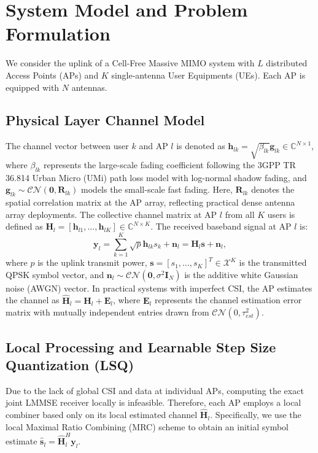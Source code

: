 \section{System Model and Problem Formulation}

We consider the uplink of a Cell-Free Massive MIMO system with $L$ distributed Access Points (APs) and $K$ single-antenna User Equipments (UEs). Each AP is equipped with $N$ antennas. 

\subsection{Physical Layer Channel Model}
The channel vector between user $k$ and AP $l$ is denoted as $\mathbf{h}_{lk} = \sqrt{\beta_{lk}} \mathbf{g}_{lk} \in \mathbb{C}^{N \times 1}$, where $\beta_{lk}$ represents the large-scale fading coefficient following the 3GPP TR 36.814 Urban Micro (UMi) path loss model with log-normal shadow fading, and $\mathbf{g}_{lk} \sim \mathcal{CN}(\mathbf{0}, \mathbf{R}_{lk})$ models the small-scale fast fading. Here, $\mathbf{R}_{lk}$ denotes the spatial correlation matrix at the AP array, reflecting practical dense antenna array deployments. 
The collective channel matrix at AP $l$ from all $K$ users is defined as $\mathbf{H}_l = [\mathbf{h}_{l1}, \dots, \mathbf{h}_{lK}] \in \mathbb{C}^{N \times K}$. The received baseband signal at AP $l$ is:
\begin{equation}
    \mathbf{y}_l = \sum_{k=1}^K \sqrt{p} \mathbf{h}_{lk} s_k + \mathbf{n}_l = \mathbf{H}_l \mathbf{s} + \mathbf{n}_l,
\end{equation}
where $p$ is the uplink transmit power, $\mathbf{s} = [s_1, \dots, s_K]^T \in \mathcal{X}^K$ is the transmitted QPSK symbol vector, and $\mathbf{n}_l \sim \mathcal{CN}(\mathbf{0}, \sigma^2 \mathbf{I}_N)$ is the additive white Gaussian noise (AWGN) vector. In practical systems with imperfect CSI, the AP estimates the channel as $\hat{\mathbf{H}}_l = \mathbf{H}_l + \mathbf{E}_l$, where $\mathbf{E}_l$ represents the channel estimation error matrix with mutually independent entries drawn from $\mathcal{CN}(0, \tau_{est}^2)$.

\subsection{Local Processing and Learnable Step Size Quantization (LSQ)}
Due to the lack of global CSI and data at individual APs, computing the exact joint LMMSE receiver locally is infeasible. Therefore, each AP employs a local combiner based only on its local estimated channel $\hat{\mathbf{H}}_l$. Specifically, we use the local Maximal Ratio Combining (MRC) scheme to obtain an initial symbol estimate $\hat{\mathbf{s}}_l = \hat{\mathbf{H}}_l^H \mathbf{y}_l$.

